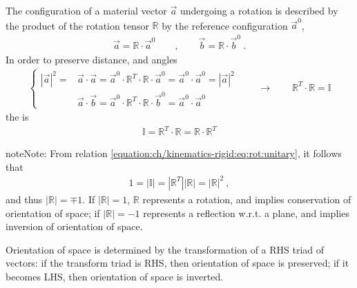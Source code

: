 \documentclass[letterpaper,10pt,english]{jupyterBook}
\begin{document}
\sphinxAtStartPar
The configuration of a material vector \(\vec{a}\) undergoing a rotation is described by the product of the rotation tensor \(\mathbb{R}\) by the reference configuration \(\vec{a}^0\),
\begin{equation*}
\begin{split}
\vec{a} = \mathbb{R} \cdot \vec{a}^0 
\qquad , \qquad
\vec{b} = \mathbb{R} \cdot \vec{b}^0 \ .
\end{split}
\end{equation*}
\sphinxAtStartPar
In order to preserve distance, and angles
\begin{equation*}
\begin{split}\begin{cases}
 |\vec{a}|^2 = & \vec{a} \cdot \vec{a} = \vec{a}^0 \cdot \mathbb{R}^T \cdot \mathbb{R} \cdot \vec{a}^0 = \vec{a}^0 \cdot \vec{a}^0 = |\vec{a}|^2 \\
               & \vec{a} \cdot \vec{b} = \vec{a}^0 \cdot \mathbb{R}^T \cdot \mathbb{R} \cdot \vec{b}^0 = \vec{a}^0 \cdot \vec{a}^0
\end{cases}
\qquad \rightarrow \qquad \mathbb{R}^T \cdot \mathbb{R} = \mathbb{I}
\end{split}
\end{equation*}
\sphinxAtStartPar
the  is 
\begin{equation}\label{equation:ch/kinematics-rigid:eq:rot:unitary}
\begin{split}\mathbb{I} = \mathbb{R}^T \cdot \mathbb{R} = \mathbb{R} \cdot \mathbb{R}^T\end{split}
\end{equation}
\begin{sphinxadmonition}{note}{Note:}
\sphinxAtStartPar
From relation \eqref{equation:ch/kinematics-rigid:eq:rot:unitary}, it follows that
\begin{equation*}
\begin{split}1 = |\mathbb{I}| = |\mathbb{R}^T| |\mathbb{R}| = |\mathbb{R}|^2 \ ,\end{split}
\end{equation*}
\sphinxAtStartPar
and thus \(|\mathbb{R}| = \mp 1\). If \(|\mathbb{R}| = 1\), \(\mathbb{R}\) represents a rotation, and implies conservation of orientation of space; if \(|\mathbb{R}| = -1\) represents a reflection w.r.t. a plane, and implies inversion of orientation of space.

\sphinxAtStartPar
Orientation of space is determined by the transformation of a RHS triad of vectors: if the transform triad is RHS, then orientation of space is preserved; if it becomes LHS, then orientation of space is inverted.
\end{sphinxadmonition}
\end{document}
